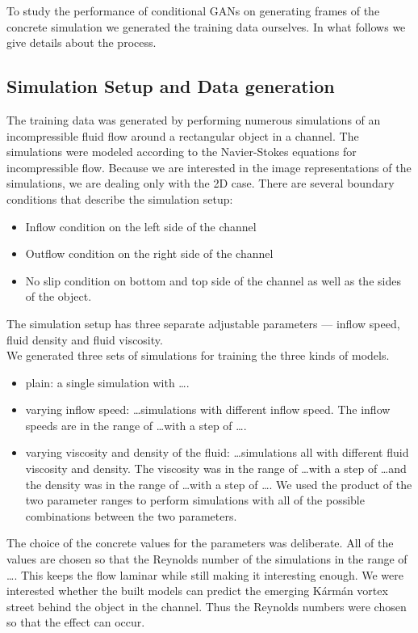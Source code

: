 \documentclass{llncs}
\begin{document}
To study the performance of conditional GANs on generating frames of the concrete simulation we generated the training data ourselves. In what follows we give details about the process.

\subsection{Simulation Setup and Data generation}
The training data was generated by performing numerous simulations of an incompressible fluid flow around a rectangular object in a channel. The simulations were modeled according to the Navier-Stokes equations for incompressible flow. Because we are interested in the image representations of the simulations, we are dealing only with the 2D case. There are several boundary conditions that describe the simulation setup:
\begin{itemize}
\item Inflow condition on the left side of the channel
\item Outflow condition on the right side of the channel
\item No slip condition on bottom and top side of the channel as well as the sides of the object.
\end{itemize}
The simulation setup has three separate adjustable parameters --- inflow speed, fluid density and fluid viscosity.
\\
We generated three sets of simulations for training the three kinds of models.
\begin{itemize}
\item plain: a single simulation with \ldots.
\item varying inflow speed: \ldots simulations with different inflow speed. The inflow speeds are in the range of \ldots with a step of \ldots.
\item varying viscosity and density of the fluid: \ldots simulations all with different fluid viscosity and density. The viscosity was in the range of \ldots with a step of \ldots and the density was in the range of \ldots with a step of \ldots. We used the product of the two parameter ranges to perform simulations with all of the possible combinations between the two parameters.
\end{itemize}

The choice of the concrete values for the parameters was deliberate. All of the values are chosen so that the Reynolds number of the simulations in the range of \ldots. This keeps the flow laminar while still making it interesting enough. We were interested whether the built models can predict the emerging Kármán vortex street behind the object in the channel. Thus the Reynolds numbers were chosen so that the effect can occur.
\end{document}
